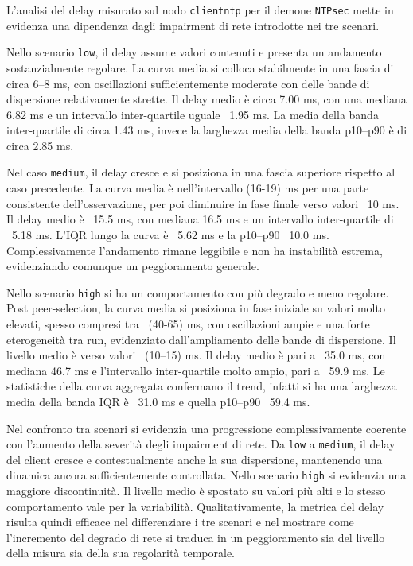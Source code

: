 L'analisi del delay misurato sul nodo \texttt{clientntp} per il demone \texttt{NTPsec}
mette in evidenza una dipendenza dagli impairment di rete introdotte nei tre
scenari.

Nello scenario \texttt{low}, il delay assume valori contenuti e presenta un
andamento sostanzialmente regolare. La curva media si colloca stabilmente in una fascia
di circa 6–8 ms, con oscillazioni sufficientemente moderate con delle bande di
dispersione relativamente strette. Il delay medio è circa 7.00 ms, con una
mediana 6.82 ms e un intervallo inter-quartile uguale ~1.95 ms. La media della
banda inter-quartile di circa 1.43 ms, invece la larghezza media della banda p10–p90
è di circa 2.85 ms.

Nel caso \texttt{medium}, il delay cresce e si posiziona in una fascia superiore rispetto
al caso precedente. La curva media è nell'intervallo (16-19) ms per una parte
consistente dell'osservazione, per poi diminuire in fase finale verso valori ~10
ms. Il delay medio è ~15.5 ms, con mediana 16.5 ms e un intervallo inter-quartile di
~5.18 ms. L'IQR lungo la curva è ~5.62 ms e la p10–p90 ~10.0 ms.
Complessivamente l'andamento rimane leggibile e non ha instabilità estrema, evidenziando
comunque un peggioramento generale.

Nello scenario \texttt{high} si ha un comportamento con più degrado e meno
regolare. Post peer-selection, la curva media si posiziona in fase iniziale su
valori molto elevati, spesso compresi tra ~(40-65) ms, con oscillazioni ampie e una
forte eterogeneità tra run, evidenziato dall'ampliamento delle bande di
dispersione. Il livello medio è verso valori ~(10–15) ms. Il delay medio è pari a ~35.0
ms, con mediana 46.7 ms e l'intervallo inter-quartile molto ampio, pari a ~59.9 ms.
Le statistiche della curva aggregata confermano il trend, infatti si ha una
larghezza media della banda IQR è ~31.0 ms e quella p10–p90 ~59.4 ms.

Nel confronto tra scenari si evidenzia una progressione complessivamente coerente
con l'aumento della severità degli impairment di rete. Da \texttt{low} a \texttt{medium},
il delay del client cresce e contestualmente anche la sua dispersione,
mantenendo una dinamica ancora sufficientemente controllata. Nello scenario \texttt{high}
si evidenzia una maggiore discontinuità. Il livello medio è spostato su valori più
alti e lo stesso comportamento vale per la variabilità. Qualitativamente, la metrica
del delay risulta quindi efficace nel differenziare i tre scenari e nel mostrare come
l'incremento del degrado di rete si traduca in un peggioramento sia del livello della
misura sia della sua regolarità temporale.

